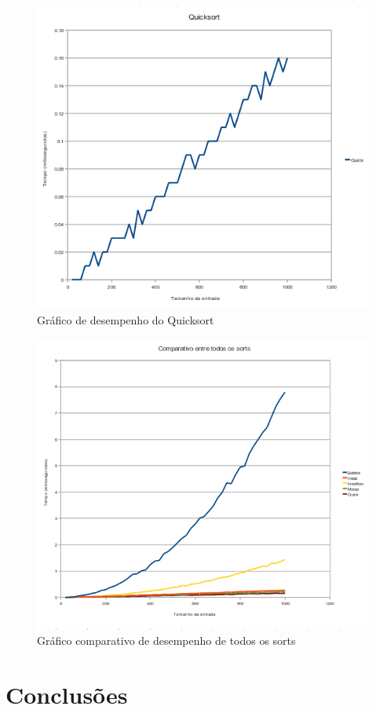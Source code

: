 \documentclass[10pt,a4paper]{article}
\begin{document}
\begin{figure}[ht]
\centering
\includegraphics[width=1.2\textwidth]{quick.png}
\caption{Gráfico de desempenho do Quicksort}
\label{fig:quick}
\end{figure}


\begin{figure}[ht]
\centering
\includegraphics[width=1.2\textwidth]{all_sorts.png}
\caption{Gráfico comparativo de desempenho de todos os sorts}
\label{fig:all_sorts}
\end{figure}


\section{Conclusões}





\end{document}
